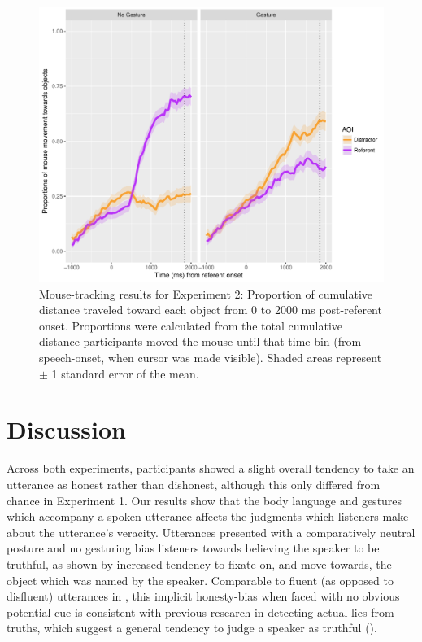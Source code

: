 \documentclass[a4paper,man,natbib]{apa6}
\begin{document}
\begin{figure}[Ht]
  \centering
	\includegraphics[width=\linewidth]{./img/e8_mouset.pdf}
  \caption{Mouse-tracking results for Experiment 2: Proportion of cumulative distance traveled toward each object from 0 to 2000 ms post-referent onset. Proportions were calculated from the total cumulative distance participants moved the mouse until that time bin (from speech-onset, when cursor was made visible). Shaded areas represent $\pm$ 1 standard error of the mean.}
  \label{fig:v2_mouse}
\end{figure}

\section{Discussion}
Across both experiments, participants showed a slight overall tendency to take an utterance as honest rather than dishonest, although this only differed from chance in Experiment 1. 
Our results show that the body language and gestures which accompany a spoken utterance affects the judgments which listeners make about the utterance's veracity.
Utterances presented with a comparatively neutral posture and no gesturing bias listeners towards believing the speaker to be truthful, as shown by increased tendency to fixate on, and move towards, the object which was named by the speaker. 
Comparable to fluent (as opposed to disfluent) utterances in \citet{Loy2017}, this implicit honesty-bias when faced with no obvious potential cue is consistent with previous research in detecting actual lies from truths, which suggest a general tendency to judge a speaker as truthful (\citealt{Vrij2000}).
\end{document}
